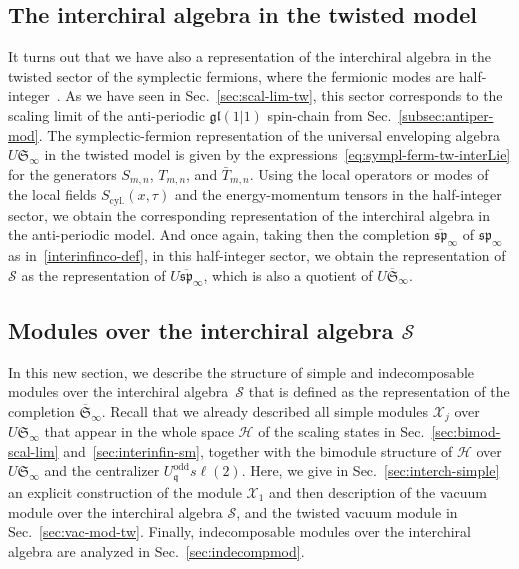 \documentclass[11pt]{article}
\newcommand{\strt}{T}
\newcommand{\bstrt}{\bar{\strt}}
\newcommand{\q}{\mathfrak{q}}
\newcommand{\JTL}[1]{JTL_{#1}}
\newcommand{\LQGodd}{U^{\text{odd}}_{\q} s\ell(2)}
\newcommand{\Hilb}{\mathcal{H}}
\newcommand{\interLie}{\mathfrak{S}}
\newcommand{\interchalg}{\mathcal{S}}
\newcommand{\interfin}[1]{\interLie_{#1}}
\newcommand{\spinf}{\ssp_{\infty}}
\newcommand{\interinfin}{\interLie_{\infty}}
\newcommand{\interinfinco}{\overline{\interLie}_{\infty}}
\newcommand{\interM}[1]{\mathscr{X}_{#1}}
\newcommand{\gl}{\mathfrak{gl}}
\newcommand{\ssp}{\mathfrak{sp}}
\newcommand{\bimnch}{\boldsymbol{\mathcal{H}}}
\newcommand{\enrg}{S}
\newcommand{\enrgcyl}{\enrg_{\text{cyl.}}}
\theoremstyle{definition}
\begin{document}
\subsection{The interchiral algebra in the twisted model}\label{sec:interchalg-tw}


It turns out that we have also a representation of the interchiral algebra  in the twisted sector of the
symplectic fermions,  where the fermionic  modes are half-integer~\cite{Kausch}. As we have seen in Sec.~\ref{sec:scal-lim-tw}, this sector corresponds to  the scaling limit of
the anti-periodic $\gl(1|1)$ spin-chain from
Sec.~\ref{subsec:antiper-mod}.
The symplectic-fermion representation
of the universal enveloping algebra $U\interinfin$
in  the twisted model is given by the expressions~\eqref{eq:sympl-ferm-tw-interLie} for the generators $\enrg_{m,n}$, $\strt_{m,n}$, and $\bstrt_{m,n}$.
Using the local operators or modes of the local fields $\enrgcyl(x,\tau)$ and the energy-momentum tensors in the half-integer sector, we obtain the corresponding representation of the interchiral algebra in the anti-periodic model. And once again, taking then the completion  $\overline{\ssp}_{\infty}$ of $\spinf$ as in~\eqref{interinfinco-def}, in this half-integer sector, we obtain the representation of $\interchalg$ as the representation of $U\overline{\ssp}_{\infty}$, which is also a quotient of $U\interinfinco$.






\subsection{Modules over the interchiral algebra $\interchalg$} \label{sec:simpl-JTL-Vir}

In this new  section, we describe the structure of simple and indecomposable modules over the interchiral algebra~$\interchalg$ that is defined as the representation of the completion $\interinfinco$.
Recall that we already described all simple modules $\interM{j}$ over $U\interinfin$ that appear in the whole space $\Hilb$ of the scaling states in Sec.~\ref{sec:bimod-scal-lim} and~\ref{sec:interinfin-sm},
 together with the bimodule structure of $\Hilb$ over $U\interinfin$ and the centralizer $\LQGodd$.
 Here, we give  in Sec.~\ref{sec:interch-simple} an explicit construction of the module $\interM{1}$ and then description of the vacuum module over the interchiral algebra $\interchalg$, and the twisted vacuum module in Sec.~\ref{sec:vac-mod-tw}.  Finally,  indecomposable modules over the interchiral algebra are analyzed in Sec.~\ref{sec:indecompmod}.
\end{document}
